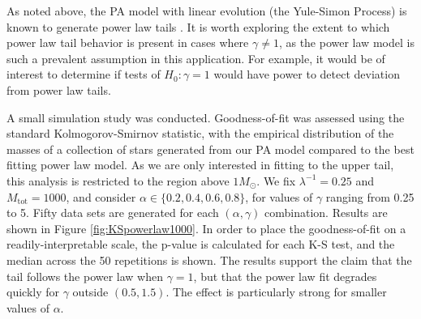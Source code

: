 \documentclass[12pt]{article}
\newcommand{\jessi}[1]{{\color{blue}[[\textbf{Jessi: }#1]]}}
\newcommand{\Msun}{M_{\odot}}
\newcommand{\Mtot}{M_{\text{tot}}}
\begin{document}
As noted above, the PA model with linear evolution (the Yule-Simon Process) is 
known to generate power law tails \citep{newman2005}.
It is worth exploring the extent to which power law tail behavior is present 
in cases where $\gamma \neq 1$, as the power law model is such a prevalent
assumption in this application. For example, it would be of interest to determine
if tests of $H_0\!:\gamma = 1$ would have power to detect deviation from
power law tails.

A small simulation study was conducted. Goodness-of-fit was assessed using the
standard Kolmogorov-Smirnov statistic, with the empirical distribution
of the masses of a collection of stars generated 
from our PA model compared to the best fitting power law model.
As we are only interested in fitting to the upper tail, this analysis 
is restricted to the region above $1 \Msun$. We fix $\lambda^{-1} = 0.25$
and $\Mtot = 1000$, and consider $\alpha \in \{0.2,0.4,0.6,0.8\}$, for
values of $\gamma$ ranging from 0.25 to 5. Fifty data sets are generated
for each $(\alpha, \gamma)$ combination. Results are shown in Figure \ref{fig:KSpowerlaw1000}.
In order to place the goodness-of-fit on a readily-interpretable scale, the p-value
is calculated for each K-S test, and the median across the 50 repetitions is shown.
The results support the claim that the tail follows the power law when $\gamma = 1$, but that
the power law fit degrades quickly for $\gamma$ outside $(0.5, 1.5)$. The effect is particularly
strong for smaller values of $\alpha$.

\end{document}
